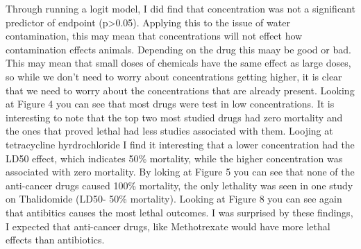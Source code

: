 \documentclass[12pt,]{article}
\begin{document}
Through running a logit model, I did find that concentration was not a
significant predictor of endpoint (p\textgreater{}0.05). Applying this
to the issue of water contamination, this may mean that concentrations
will not effect how contamination effects animals. Depending on the drug
this maay be good or bad. This may mean that small doses of chemicals
have the same effect as large doses, so while we don't need to worry
about concentrations getting higher, it is clear that we need to worry
about the concentrations that are already present. Looking at Figure 4
you can see that most drugs were test in low concentrations. It is
interesting to note that the top two most studied drugs had zero
mortality and the ones that proved lethal had less studies associated
with them. Loojing at tetracycline hyrdrochloride I find it interesting
that a lower concentration had the LD50 effect, which indicates 50\%
mortality, while the higher concentration was associated with zero
mortality. By loking at Figure 5 you can see that none of the
anti-cancer drugs caused 100\% mortality, the only lethality was seen in
one study on Thalidomide (LD50- 50\% mortality). Looking at Figure 8 you
can see again that antibitics causes the most lethal outcomes. I was
surprised by these findings, I expected that anti-cancer drugs, like
Methotrexate would have more lethal effects than antibiotics.
\end{document}
